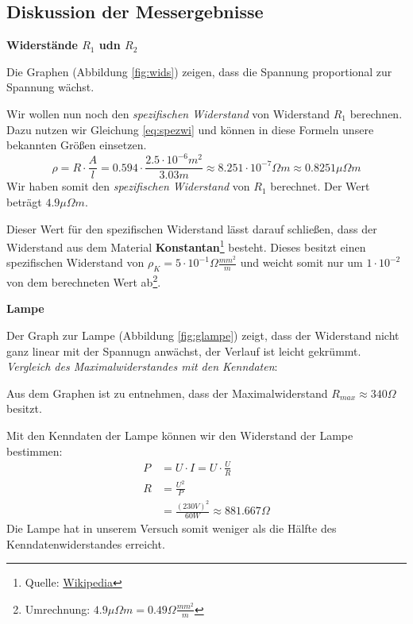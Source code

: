 \documentclass[10pt,a4paper]{article}
\begin{document}
\subsection{Diskussion der Messergebnisse}
\begin{flushleft}
\textbf{Widerstände $R_1$ udn $R_2$}

Die Graphen (Abbildung \ref{fig:wids}) zeigen, dass die Spannung proportional zur Spannung wächst.

Wir wollen nun noch den \textit{spezifischen Widerstand} von Widerstand $R_1$ berechnen. Dazu nutzen wir Gleichung \ref{eq:spezwi} und können in diese Formeln unsere bekannten Größen einsetzen.
\begin{equation*}
\rho = R \cdot \frac{A}{l} = 0.594 \cdot \frac{2.5 \cdot 10^{-6}m^2}{3.03m} \approx 8.251 \cdot 10^{-7} \Omega m \approx 0.8251 \mu \Omega m
\end{equation*}
Wir haben somit den \textit{spezifischen Widerstand} von $R_1$ berechnet. Der Wert beträgt $4.9 \mu \Omega m$.

Dieser Wert für den spezifischen Widerstand lässt darauf schließen, dass der Widerstand aus dem Material \textbf{Konstantan}\footnote{Quelle: \href{https://de.wikipedia.org/wiki/Spezifischer_Widerstand}{Wikipedia}} besteht. Dieses besitzt einen spezifischen Widerstand von $\rho_K = 5 \cdot10^{-1} \Omega \frac{mm^2}{m}$ und weicht somit nur um $1 \cdot 10^{-2}$ von dem berechneten Wert ab\footnote{Umrechnung: $4.9 \mu \Omega m = 0.49 \Omega \frac{mm^2}{m}$}.
\end{flushleft}
\begin{flushleft}
\textbf{Lampe}

Der Graph zur Lampe (Abbildung \ref{fig:glampe}) zeigt, dass der Widerstand nicht ganz linear mit der Spannugn anwächst, der Verlauf ist leicht gekrümmt. \\

\textit{Vergleich des Maximalwiderstandes mit den Kenndaten}:

Aus dem Graphen ist zu entnehmen, dass der Maximalwiderstand $R_{max} \approx 340 \Omega$ besitzt.

Mit den Kenndaten der Lampe können wir den Widerstand der Lampe bestimmen:
\begin{align*}
P &= U \cdot I = U \cdot \frac{U}{R} \\
R &= \frac{U^2}{P} \\
&= \frac{(230 V)^2}{60W} \approx 881.667 \Omega
\end{align*}
Die Lampe hat in unserem Versuch somit weniger als die Hälfte des Kenndatenwiderstandes erreicht.
\end{flushleft}
\end{document}
